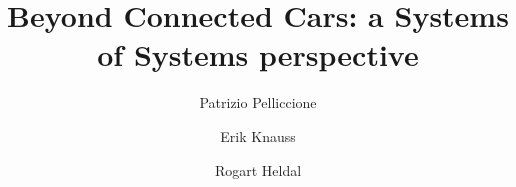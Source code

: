 \documentclass[preprint]{elsarticle}
\begin{document}
\begin{frontmatter}

\title{Beyond Connected Cars: a Systems of Systems perspective
}

\author[uda,gu]{Patrizio Pelliccione}
\author[gu]{Erik Knauss}
\author[ber]{Rogart Heldal}


\address[uda]{Universit\`a degli Studi dell'Aquila,
  Dipartimento di Informatica,\\
  {\tt patrizio.pelliccione@univaq.it}}
\address[gu]{Chalmers|Gothenburg University
  Gothenburg, Sweden\\
  {\tt \{erik.knauss,patrizio.pelliccione\}@gu.se}}
\address[ber]{Bergen University
  Bergen, Norway\\
  {\tt rogardt.heldal@hvl.no} } 


\end{frontmatter}














\end{document}
